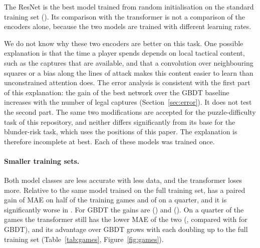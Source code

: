 \documentclass[11pt]{article}
\begin{document}
\ifchangeconv
The ResNet is the best model trained from random initialisation on the
standard training set (). Its comparison with
the transformer is not a comparison of the encoders alone, because the two
models are trained with different learning rates.
\fi

We do not know why these two encoders are better on this task. One possible
explanation is that the time a player spends depends on local tactical
content, such as the captures that are available, and that a convolution over
neighbouring squares or a bias along the lines of attack makes this content
easier to learn than unconstrained attention does. The error analysis is
consistent with the first part of this explanation\iflook: the gain of the
best network over the GBDT baseline increases with the number of legal
captures (Section~\ref{sec:error})\fi. It does not test the second part. The
same two modifications are accepted for the puzzle-difficulty task of this
repository, and neither differs significantly from its base for the
blunder-risk task, which uses the positions of this paper. The explanation is
therefore incomplete at best. Each of these models was trained once.
\fi



\ifgames
\paragraph{Smaller training sets.}
Both model classes are less accurate with less data, and the transformer
loses more. Relative to the same model trained on the full training set,
 has a paired gain of
 MAE on
half of the training games and of
 on a
quarter, and it is significantly worse in
. For GBDT the gains are
() and
(). On a quarter of the games the
transformer still has the lower MAE of the two
(, compared with
 for GBDT), and its advantage over GBDT grows
with each doubling up to the full training set (Table~\ref{tab:games},
Figure~\ref{fig:games}).
\fi

\ifmore
\end{document}
